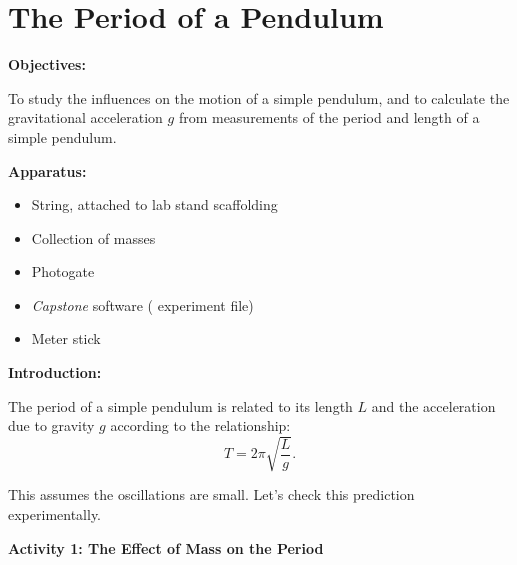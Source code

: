 \section{The Period of a Pendulum}

\makelabheader %

\bigskip
\textbf{Objectives:}

To study the influences on the motion of a simple pendulum, and to calculate the gravitational acceleration $g$ from measurements of the period and length of a simple pendulum.

\bigskip
\textbf{Apparatus:}
\begin{itemize}[nosep]
\item String, attached to lab stand scaffolding
\item Collection of masses 
\item Photogate
\item \textit{Capstone} software ( experiment file)
\item Meter stick
\end{itemize}

\bigskip
\textbf{Introduction:}

The period of a simple pendulum is related to its length $L$ and the acceleration due to gravity $g$ according to the relationship:
\begin{equation}
T=2\pi \sqrt{\frac{L}{g}}.
\end{equation}

This assumes the oscillations are small. Let's check this prediction experimentally. 

\bigskip
\textbf{Activity 1: The Effect of Mass on the Period} 


